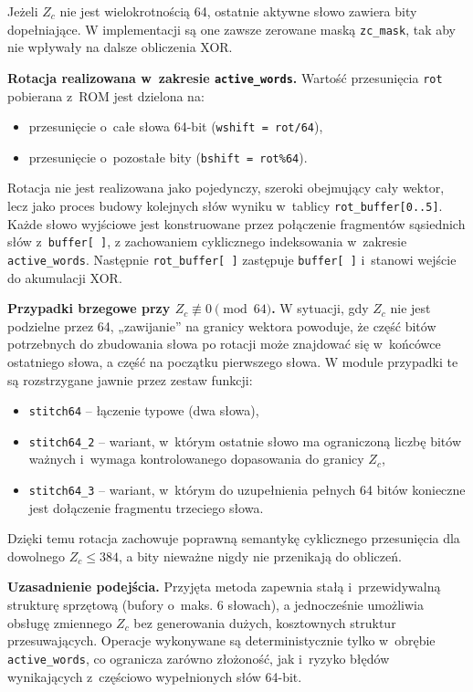 Jeżeli $Z_c$ nie jest wielokrotnością 64, ostatnie aktywne słowo zawiera bity dopełniające.
W implementacji są one zawsze zerowane maską \texttt{zc\_mask}, tak aby nie wpływały na dalsze obliczenia XOR.

\medskip
\noindent\textbf{Rotacja realizowana w~zakresie \texttt{active\_words}.}
Wartość przesunięcia \texttt{rot} pobierana z~ROM jest dzielona na:
\begin{itemize}
  \item przesunięcie o~całe słowa 64-bit (\texttt{wshift = rot/64}),
  \item przesunięcie o~pozostałe bity (\texttt{bshift = rot\%64}).
\end{itemize}
Rotacja nie jest realizowana jako pojedynczy, szeroki  obejmujący cały wektor,
lecz jako proces budowy kolejnych słów wyniku w~tablicy \texttt{rot\_buffer[0..5]}.
Każde słowo wyjściowe jest konstruowane przez połączenie fragmentów sąsiednich słów z~\texttt{buffer[ ]},
z zachowaniem cyklicznego indeksowania w~zakresie \texttt{active\_words}. Następnie \texttt{rot\_buffer[ ]}
zastępuje \texttt{buffer[ ]} i~stanowi wejście do akumulacji XOR.

\medskip
\noindent\textbf{Przypadki brzegowe przy $Z_c \not\equiv 0 \pmod{64}$.}
W sytuacji, gdy $Z_c$ nie jest podzielne przez 64, „zawijanie” na granicy wektora powoduje,
że część bitów potrzebnych do zbudowania słowa po rotacji może znajdować się w~końcówce ostatniego słowa,
a część na początku pierwszego słowa. W module przypadki te są rozstrzygane jawnie przez zestaw funkcji:
\begin{itemize}
  \item \texttt{stitch64} -- łączenie typowe (dwa słowa),
  \item \texttt{stitch64\_2} -- wariant, w~którym ostatnie słowo ma ograniczoną liczbę bitów ważnych
        i~wymaga kontrolowanego dopasowania do granicy $Z_c$,
  \item \texttt{stitch64\_3} -- wariant, w~którym do uzupełnienia pełnych 64 bitów konieczne jest
        dołączenie fragmentu trzeciego słowa.
\end{itemize}
Dzięki temu rotacja zachowuje poprawną semantykę cyklicznego przesunięcia dla dowolnego $Z_c \le 384$,
a bity nieważne nigdy nie przenikają do obliczeń.

\medskip
\noindent\textbf{Uzasadnienie podejścia.}
Przyjęta metoda zapewnia stałą i~przewidywalną strukturę sprzętową (bufory o~maks. 6 słowach),
a jednocześnie umożliwia obsługę zmiennego $Z_c$ bez generowania dużych, kosztownych struktur przesuwających.
Operacje wykonywane są deterministycznie tylko w~obrębie \texttt{active\_words}, co ogranicza zarówno złożoność,
jak i~ryzyko błędów wynikających z~częściowo wypełnionych słów 64-bit.



